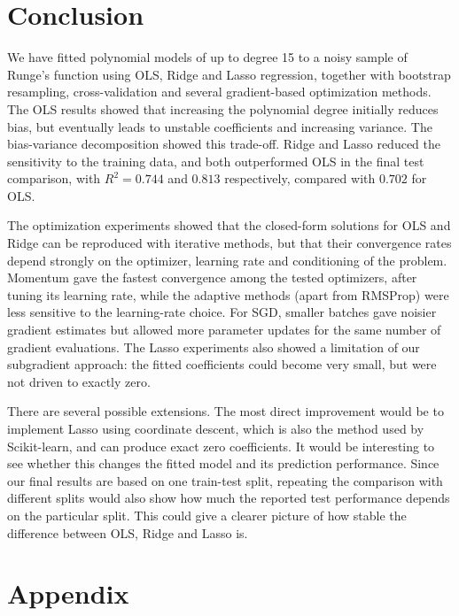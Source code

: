 \documentclass[amssymb,twocolumn,aps]{revtex4}
\begin{document}
\section{Conclusion}\label{section:conclusion}
We have fitted polynomial models of up to degree 15 to a noisy sample of Runge's function using OLS, Ridge and Lasso regression, together with bootstrap resampling, cross-validation and several gradient-based optimization methods. The OLS results showed that increasing the polynomial degree initially reduces bias, but eventually leads to unstable coefficients and increasing variance. The bias-variance decomposition showed this trade-off. Ridge and Lasso reduced the sensitivity to the training data, and both outperformed OLS in the final test comparison, with $R^2=0.744$ and $0.813$ respectively, compared with $0.702$ for OLS.

The optimization experiments showed that the closed-form solutions for OLS and Ridge can be reproduced with iterative methods, but that their convergence rates depend strongly on the optimizer, learning rate and conditioning of the problem. Momentum gave the fastest convergence among the tested optimizers, after tuning its learning rate, while the adaptive methods (apart from RMSProp) were less sensitive to the learning-rate choice. For SGD, smaller batches gave noisier gradient estimates but allowed more parameter updates for the same number of gradient evaluations. The Lasso experiments also showed a limitation of our subgradient approach: the fitted coefficients could become very small, but were not driven to exactly zero.

There are several possible extensions. The most direct improvement would be to implement Lasso using coordinate descent, which is also the method used by Scikit-learn, and can produce exact zero coefficients. It would be interesting to see whether this changes the fitted model and its prediction performance. Since our final results are based on one train-test split, repeating the comparison with different splits would also show how much the reported test performance depends on the particular split. This could give a clearer picture of how stable the difference between OLS, Ridge and Lasso is.



\onecolumngrid
\newpage

\section{Appendix}
\appendix
\end{document}
